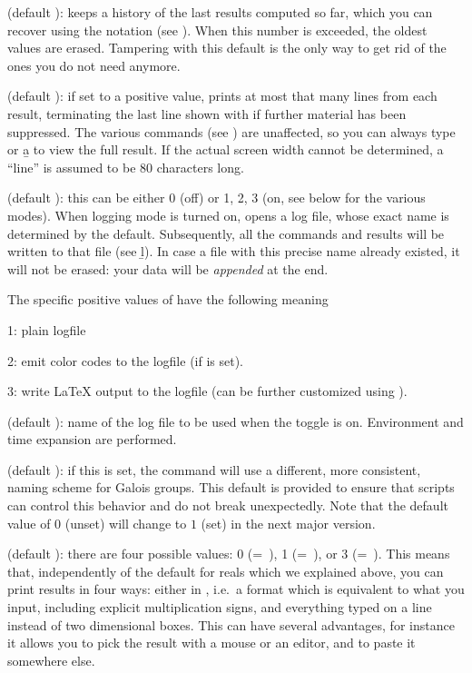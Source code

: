  (default ):  keeps a history of the last
 results computed so far, which you can recover using the
\kbd{\%} notation (see ). When this number is exceeded,
the oldest values are erased. Tampering with this default is the only way to
get rid of the ones you do not need anymore.

 (default ): if set to a positive value,  prints at
most that many lines from each result, terminating the last line shown with
\kbd{[+++]} if further material has been suppressed. The various 
commands (see ) are unaffected, so you can always type
 or \b{a} to view the full result. If the actual
screen width cannot be determined, a ``line'' is assumed to be 80 characters
long.

 (default ): this can be either 0 (off) or 1, 2, 3
(on, see below for the various modes). When logging mode is turned on,
opens a log file, whose exact name is determined by the 
default. Subsequently, all the commands and results will be written to that
file (see \b{l}). In case a file with this precise name already existed, it
will not be erased: your data will be \emph{appended} at the end.

The specific positive values of  have the following meaning

1: plain logfile

2: emit color codes to the logfile (if  is set).

3: write LaTeX output to the logfile (can be further customized using
).

 (default ): name of the log file to be
used when the  toggle is on. Environment and time expansion are
performed.

 (default ): if
this is set, the  command will use a different, more
consistent, naming scheme for Galois groups. This default is provided to
ensure that scripts can control this behavior and do not break unexpectedly.
Note that the default value of $0$ (unset) will change to $1$ (set) in the
next major version.

 (default ): there are four possible values: 0
(=~), 1 (=~), or 3
(=~). This
means that, independently of the default  for reals which we
explained above, you can print results in four ways: either in , i.e.~a format which is equivalent to what you input, including
explicit multiplication signs, and everything typed on a line instead of
two dimensional boxes. This can have several advantages, for instance it
allows you to pick the result with a mouse or an editor, and to paste it
somewhere else.\label{se:output}

